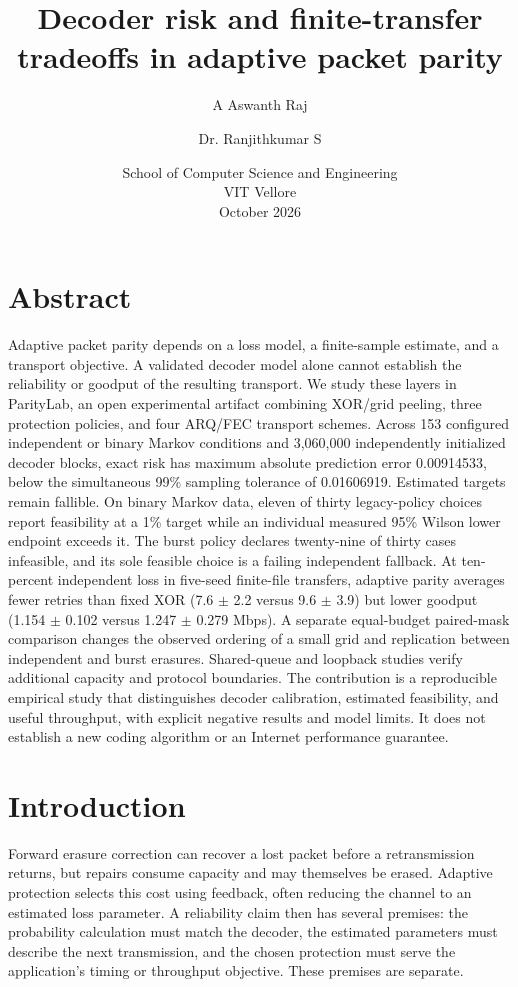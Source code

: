 \documentclass[11pt,a4paper]{article}
\title{Decoder risk and finite-transfer tradeoffs in adaptive packet parity}
\author{A Aswanth Raj \and Dr. Ranjithkumar S}
\date{School of Computer Science and Engineering\\VIT Vellore\\October 2026}
\begin{document}
\maketitle
\section*{Abstract}
Adaptive packet parity depends on a loss model, a finite-sample estimate, and a transport objective. A validated decoder model alone cannot establish the reliability or goodput of the resulting transport. We study these layers in ParityLab, an open experimental artifact combining XOR/grid peeling, three protection policies, and four ARQ/FEC transport schemes. Across 153 configured independent or binary Markov conditions and 3,060,000 independently initialized decoder blocks, exact risk has maximum absolute prediction error 0.00914533, below the simultaneous 99\% sampling tolerance of 0.01606919. Estimated targets remain fallible. On binary Markov data, eleven of thirty legacy-policy choices report feasibility at a 1\% target while an individual measured 95\% Wilson lower endpoint exceeds it. The burst policy declares twenty-nine of thirty cases infeasible, and its sole feasible choice is a failing independent fallback. At ten-percent independent loss in five-seed finite-file transfers, adaptive parity averages fewer retries than fixed XOR (7.6 $\pm$ 2.2 versus 9.6 $\pm$ 3.9) but lower goodput (1.154 $\pm$ 0.102 versus 1.247 $\pm$ 0.279 Mbps). A separate equal-budget paired-mask comparison changes the observed ordering of a small grid and replication between independent and burst erasures. Shared-queue and loopback studies verify additional capacity and protocol boundaries. The contribution is a reproducible empirical study that distinguishes decoder calibration, estimated feasibility, and useful throughput, with explicit negative results and model limits. It does not establish a new coding algorithm or an Internet performance guarantee.

\section{Introduction}
Forward erasure correction can recover a lost packet before a retransmission returns, but repairs consume capacity and may themselves be erased. Adaptive protection selects this cost using feedback, often reducing the channel to an estimated loss parameter. A reliability claim then has several premises: the probability calculation must match the decoder, the estimated parameters must describe the next transmission, and the chosen protection must serve the application's timing or throughput objective. These premises are separate.
\end{document}

